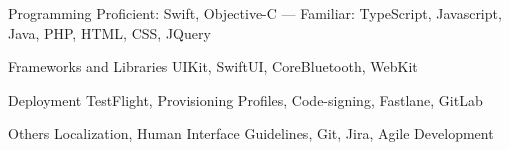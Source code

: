 

\begin{cvskills}

  \cvskill
    {Programming} %
    {Proficient: Swift, Objective-C --- Familiar: TypeScript, Javascript, Java, PHP, HTML, CSS, JQuery} %

  \cvskill
    {Frameworks and Libraries} %
    {UIKit, SwiftUI, CoreBluetooth, WebKit} %
    
  \cvskill
    {Deployment} %
    {TestFlight, Provisioning Profiles, Code-signing, Fastlane, GitLab} %

  \cvskill
    {Others} %
    {Localization, Human Interface Guidelines, Git, Jira, Agile Development} %

\end{cvskills}